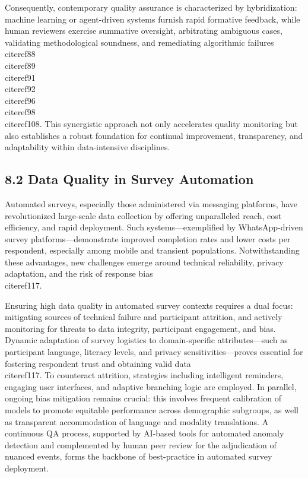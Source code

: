 \documentclass[11pt]{article}
\begin{document}
Consequently, contemporary quality assurance is characterized by hybridization: machine learning or agent-driven systems furnish rapid formative feedback, while human reviewers exercise summative oversight, arbitrating ambiguous cases, validating methodological soundness, and remediating algorithmic failures \\cite{ref88}\\cite{ref89}\\cite{ref91}\\cite{ref92}\\cite{ref96}\\cite{ref98}\\cite{ref108}. This synergistic approach not only accelerates quality monitoring but also establishes a robust foundation for continual improvement, transparency, and adaptability within data-intensive disciplines.

\subsection{8.2 Data Quality in Survey Automation}

Automated surveys, especially those administered via messaging platforms, have revolutionized large-scale data collection by offering unparalleled reach, cost efficiency, and rapid deployment. Such systems—exemplified by WhatsApp-driven survey platforms—demonstrate improved completion rates and lower costs per respondent, especially among mobile and transient populations. Notwithstanding these advantages, new challenges emerge around technical reliability, privacy adaptation, and the risk of response bias \\cite{ref117}.

Ensuring high data quality in automated survey contexts requires a dual focus: mitigating sources of technical failure and participant attrition, and actively monitoring for threats to data integrity, participant engagement, and bias. Dynamic adaptation of survey logistics to domain-specific attributes—such as participant language, literacy levels, and privacy sensitivities—proves essential for fostering respondent trust and obtaining valid data \\cite{ref117}. To counteract attrition, strategies including intelligent reminders, engaging user interfaces, and adaptive branching logic are employed. In parallel, ongoing bias mitigation remains crucial: this involves frequent calibration of models to promote equitable performance across demographic subgroups, as well as transparent accommodation of language and modality translations. A continuous QA process, supported by AI-based tools for automated anomaly detection and complemented by human peer review for the adjudication of nuanced events, forms the backbone of best-practice in automated survey deployment.
\end{document}
